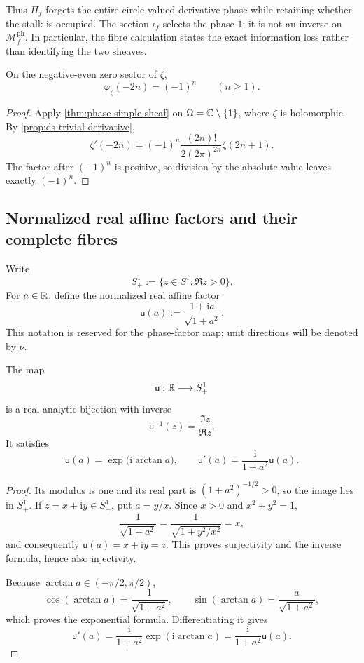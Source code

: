 Thus \(\Pi_f\) forgets the entire circle-valued derivative phase while retaining
whether the stalk is occupied.  The section \(\iota_f\) selects the phase \(1\);
it is not an inverse on \(\mathcal M_f^{\mathrm{ph}}\).  In particular, the fibre
calculation
states the exact information loss rather than identifying the two sheaves.

\begin{corollary}
\label{cor:phase-trivial-section}
On the negative-even zero sector of \(\zeta\),
\[
 \varphi_\zeta(-2n)=(-1)^n
 \qquad(n\geq1).
\]
\end{corollary}

\begin{proof}
Apply \cref{thm:phase-simple-sheaf} on
\(\Omega=\mathbb C\setminus\{1\}\), where \(\zeta\) is holomorphic.
By \cref{prop:ds-trivial-derivative},
\[
 \zeta'(-2n)
 =
 (-1)^n
 \frac{(2n)!}{2(2\pi)^{2n}}\zeta(2n+1).
\]
The factor after \((-1)^n\) is positive, so division by the absolute value
leaves exactly \((-1)^n\).
\end{proof}

\subsection{Normalized real affine factors and their complete fibres}

Write
\[
 S^1_+:=\{z\in S^1:\Re z>0\}.
\]
For \(a\in\mathbb R\), define the normalized real affine factor
\[
 \mathsf u(a):=\frac{1+\mathrm ia}{\sqrt{1+a^2}}.
\]
This notation is reserved for the phase-factor map; unit directions will be
denoted by \(\nu\).

\begin{proposition}
\label{prop:phase-one-factor}
The map
\[
 \mathsf u:\mathbb R\longrightarrow S^1_+
\]
is a real-analytic bijection with inverse
\[
 \mathsf u^{-1}(z)=\frac{\Im z}{\Re z}.
\]
It satisfies
\[
 \mathsf u(a)=\exp\bigl(\mathrm i\arctan a\bigr),
 \qquad
 \mathsf u'(a)=\frac{\mathrm i}{1+a^2}\mathsf u(a).
\]
\end{proposition}

\begin{proof}
Its modulus is one and its real part is
\((1+a^2)^{-1/2}>0\), so the image lies in \(S^1_+\).  If
\(z=x+\mathrm iy\in S^1_+\), put \(a=y/x\).  Since \(x>0\) and
\(x^2+y^2=1\),
\[
 \frac{1}{\sqrt{1+a^2}}
 =
 \frac{1}{\sqrt{1+y^2/x^2}}
 =x,
\]
and consequently \(\mathsf u(a)=x+\mathrm iy=z\).  This proves surjectivity
and the inverse formula, hence also injectivity.

Because \(\arctan a\in(-\pi/2,\pi/2)\),
\[
 \cos(\arctan a)=\frac1{\sqrt{1+a^2}},
 \qquad
 \sin(\arctan a)=\frac a{\sqrt{1+a^2}},
\]
which proves the exponential formula.  Differentiating it gives
\[
 \mathsf u'(a)
 =
 \frac{\mathrm i}{1+a^2}
 \exp(\mathrm i\arctan a)
 =
 \frac{\mathrm i}{1+a^2}\mathsf u(a).
\]
\end{proof}

